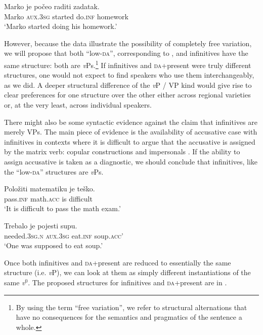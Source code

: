 \documentclass[output=paper,modfonts,newtxmath,hidelinks,]{langscibook}
\begin{document}
\ea \label{7:ex11}
\gll Marko je počeo raditi zadatak.\\
     Marko \textsc{aux.3sg} started do.\textsc{inf} homework\\
\glt `Marko started doing his homework.'
\z

\noindent However, because the data illustrate the possibility of completely free variation, we will propose that both ``low-\textsc{da}'', corresponding to , and infinitives have the same structure: both are \textit{v}Ps.\footnote{\label{7:fn4}By using the term ``free variation'', we refer to structural alternations that have no consequences for the semantics and pragmatics of the sentence a whole.}  If infinitives and \textsc{da}+present were truly different structures, one would not expect to find speakers who use them interchangeably, as we did. A deeper structural difference of the \textit{v}P / VP kind would give rise to clear preferences for one structure over the other either across regional varieties or, at the very least, across individual speakers.



There might also  be some syntactic evidence against the claim that infinitives are merely VPs. The main piece of evidence is the availability of accusative case with infinitives in contexts where it is difficult to argue that the accusative is assigned by the matrix verb: copular constructions  and impersonals . If the ability to assign accusative is taken as a diagnostic, we should conclude that infinitives, like the ``low-\textsc{da}'' structures are \textit{v}Ps.

\ea \label{7:ex12}
\gll Položiti matematiku je teško.\\
     pass.\textsc{inf} math.\textsc{acc} is difficult\\
\glt `It is difficult to pass the math exam.'
\z

\ea \label{7:ex13}
\gll Trebalo je pojesti supu.\\
     needed.\textsc{3sg.n} \textsc{aux.3sg} eat.\textsc{inf} soup.\textsc{acc}'\\
\glt `One was supposed to eat soup.'
\z

\noindent Once both infinitives and \textsc{da}+present are reduced to essentially the same structure (i.e. \textit{v}P), we can look at them as simply different instantiations of the same \textit{v$^0$}. The proposed structures for infinitives and \textsc{da}+present are in .\largerpage[-1]
\end{document}
